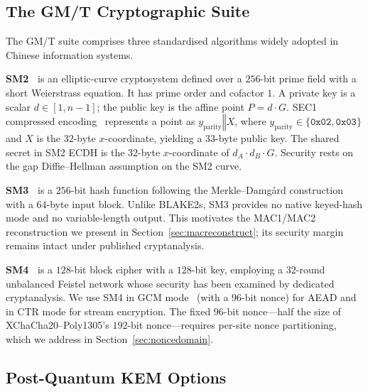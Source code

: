 \documentclass{SCIS2026}
\newcommand{\concat}{\mathbin{\Vert}}
\begin{document}
\subsection{The GM/T Cryptographic Suite}
\label{sec:gmt}

The GM/T suite comprises three standardised algorithms widely adopted
in Chinese information systems.

\textbf{SM2~\cite{17,18}} is an elliptic-curve
cryptosystem defined over a $256$-bit prime field with a short
Weierstrass equation.  It has prime order and cofactor $1$.  A
private key is a scalar $d \in [1, n-1]$; the public key is the
affine point $P = d\cdot G$.  SEC1 compressed encoding~\cite{24} represents a
point as $y_{\text{parity}} \concat X$, where $y_{\text{parity}} \in
\{\texttt{0x02},\texttt{0x03}\}$ and $X$ is the $32$-byte
$x$-coordinate, yielding a $33$-byte public key.  The shared secret
in SM2 ECDH is the $32$-byte $x$-coordinate of $d_A \cdot d_B \cdot
G$.  Security rests on the gap Diffie--Hellman assumption on the SM2
curve.

\textbf{SM3~\cite{19}} is a $256$-bit hash function following
the Merkle--Damg\aa rd construction~\cite{25,26}
with a $64$-byte input block.  Unlike BLAKE2s, SM3 provides no native
keyed-hash mode and no variable-length output.  This motivates the
MAC1/MAC2 reconstruction we present in Section~\ref{sec:macreconstruct};
its security margin remains intact under published
cryptanalysis.

\textbf{SM4~\cite{20}} is a $128$-bit block cipher with a
$128$-bit key, employing a $32$-round unbalanced Feistel network whose
security has been examined by dedicated cryptanalysis.
We use SM4 in GCM mode~\cite{27,28} (with a $96$-bit
nonce) for AEAD and in CTR mode for stream encryption.  The fixed $96$-bit nonce---half the
size of XChaCha20--Poly1305's $192$-bit nonce---requires per-site
nonce partitioning, which we address in
Section~\ref{sec:noncedomain}.

\subsection{Post-Quantum KEM Options}
\label{sec:kemoptions}
\end{document}
